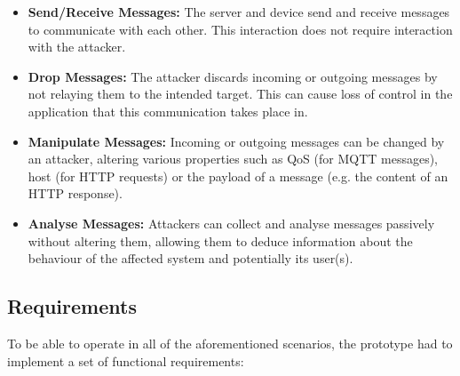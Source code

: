 \begin{itemize}
    \item \textbf{Send/Receive Messages:} The server and device send and receive messages to communicate with each other. This interaction does not require interaction with the attacker.
    \item \textbf{Drop Messages:} The attacker discards incoming or outgoing messages by not relaying them to the intended target. This can cause loss of control in the application that this communication takes place in.
    \item \textbf{Manipulate Messages:} Incoming or outgoing messages can be changed by an attacker, altering various properties such as \ac{QoS} (for \ac{MQTT} messages), host (for \ac{HTTP} requests) or the payload of a message (e.g. the content of an \ac{HTTP} response).
    \item \textbf{Analyse Messages:} Attackers can collect and analyse messages passively without altering them, allowing them to deduce information about the behaviour of the affected system and potentially its user(s).
\end{itemize}

\subsection{Requirements}
\label{sec:prototype-requirements}
To be able to operate in all of the aforementioned scenarios, the prototype had to implement a set of functional requirements:

